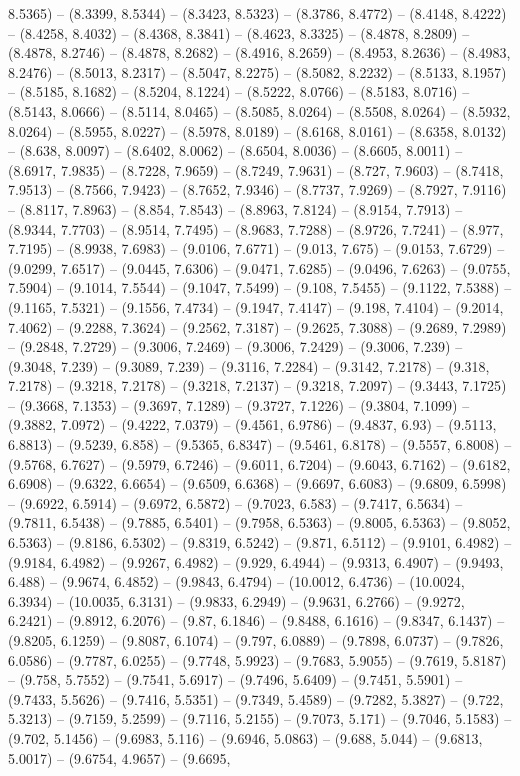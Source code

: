 8.5365) -- (8.3399, 8.5344) -- (8.3423, 8.5323) -- (8.3786, 8.4772) -- (8.4148, 8.4222) -- (8.4258, 8.4032) -- (8.4368, 8.3841) -- (8.4623, 8.3325) -- (8.4878, 8.2809) -- (8.4878, 8.2746) -- (8.4878, 8.2682) -- (8.4916, 8.2659) -- (8.4953, 8.2636) -- (8.4983, 8.2476) -- (8.5013, 8.2317) -- (8.5047, 8.2275) -- (8.5082, 8.2232) -- (8.5133, 8.1957) -- (8.5185, 8.1682) -- (8.5204, 8.1224) -- (8.5222, 8.0766) -- (8.5183, 8.0716) -- (8.5143, 8.0666) -- (8.5114, 8.0465) -- (8.5085, 8.0264) -- (8.5508, 8.0264) -- (8.5932, 8.0264) -- (8.5955, 8.0227) -- (8.5978, 8.0189) -- (8.6168, 8.0161) -- (8.6358, 8.0132) -- (8.638, 8.0097) -- (8.6402, 8.0062) -- (8.6504, 8.0036) -- (8.6605, 8.0011) -- (8.6917, 7.9835) -- (8.7228, 7.9659) -- (8.7249, 7.9631) -- (8.727, 7.9603) -- (8.7418, 7.9513) -- (8.7566, 7.9423) -- (8.7652, 7.9346) -- (8.7737, 7.9269) -- (8.7927, 7.9116) -- (8.8117, 7.8963) -- (8.854, 7.8543) -- (8.8963, 7.8124) -- (8.9154, 7.7913) -- (8.9344, 7.7703) -- (8.9514, 7.7495) -- (8.9683, 7.7288) -- (8.9726, 7.7241) -- (8.977, 7.7195) -- (8.9938, 7.6983) -- (9.0106, 7.6771) -- (9.013, 7.675) -- (9.0153, 7.6729) -- (9.0299, 7.6517) -- (9.0445, 7.6306) -- (9.0471, 7.6285) -- (9.0496, 7.6263) -- (9.0755, 7.5904) -- (9.1014, 7.5544) -- (9.1047, 7.5499) -- (9.108, 7.5455) -- (9.1122, 7.5388) -- (9.1165, 7.5321) -- (9.1556, 7.4734) -- (9.1947, 7.4147) -- (9.198, 7.4104) -- (9.2014, 7.4062) -- (9.2288, 7.3624) -- (9.2562, 7.3187) -- (9.2625, 7.3088) -- (9.2689, 7.2989) -- (9.2848, 7.2729) -- (9.3006, 7.2469) -- (9.3006, 7.2429) -- (9.3006, 7.239) -- (9.3048, 7.239) -- (9.3089, 7.239) -- (9.3116, 7.2284) -- (9.3142, 7.2178) -- (9.318, 7.2178) -- (9.3218, 7.2178) -- (9.3218, 7.2137) -- (9.3218, 7.2097) -- (9.3443, 7.1725) -- (9.3668, 7.1353) -- (9.3697, 7.1289) -- (9.3727, 7.1226) -- (9.3804, 7.1099) -- (9.3882, 7.0972) -- (9.4222, 7.0379) -- (9.4561, 6.9786) -- (9.4837, 6.93) -- (9.5113, 6.8813) -- (9.5239, 6.858) -- (9.5365, 6.8347) -- (9.5461, 6.8178) -- (9.5557, 6.8008) -- (9.5768, 6.7627) -- (9.5979, 6.7246) -- (9.6011, 6.7204) -- (9.6043, 6.7162) -- (9.6182, 6.6908) -- (9.6322, 6.6654) -- (9.6509, 6.6368) -- (9.6697, 6.6083) -- (9.6809, 6.5998) -- (9.6922, 6.5914) -- (9.6972, 6.5872) -- (9.7023, 6.583) -- (9.7417, 6.5634) -- (9.7811, 6.5438) -- (9.7885, 6.5401) -- (9.7958, 6.5363) -- (9.8005, 6.5363) -- (9.8052, 6.5363) -- (9.8186, 6.5302) -- (9.8319, 6.5242) -- (9.871, 6.5112) -- (9.9101, 6.4982) -- (9.9184, 6.4982) -- (9.9267, 6.4982) -- (9.929, 6.4944) -- (9.9313, 6.4907) -- (9.9493, 6.488) -- (9.9674, 6.4852) -- (9.9843, 6.4794) -- (10.0012, 6.4736) -- (10.0024, 6.3934) -- (10.0035, 6.3131) -- (9.9833, 6.2949) -- (9.9631, 6.2766) -- (9.9272, 6.2421) -- (9.8912, 6.2076) -- (9.87, 6.1846) -- (9.8488, 6.1616) -- (9.8347, 6.1437) -- (9.8205, 6.1259) -- (9.8087, 6.1074) -- (9.797, 6.0889) -- (9.7898, 6.0737) -- (9.7826, 6.0586) -- (9.7787, 6.0255) -- (9.7748, 5.9923) -- (9.7683, 5.9055) -- (9.7619, 5.8187) -- (9.758, 5.7552) -- (9.7541, 5.6917) -- (9.7496, 5.6409) -- (9.7451, 5.5901) -- (9.7433, 5.5626) -- (9.7416, 5.5351) -- (9.7349, 5.4589) -- (9.7282, 5.3827) -- (9.722, 5.3213) -- (9.7159, 5.2599) -- (9.7116, 5.2155) -- (9.7073, 5.171) -- (9.7046, 5.1583) -- (9.702, 5.1456) -- (9.6983, 5.116) -- (9.6946, 5.0863) -- (9.688, 5.044) -- (9.6813, 5.0017) -- (9.6754, 4.9657) -- (9.6695, 